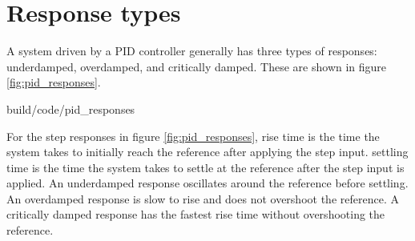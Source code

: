 \section{Response types}

A \gls{system} driven by a PID controller generally has three types of
responses: underdamped, overdamped, and critically damped. These are shown in
figure \ref{fig:pid_responses}.

\begin{svg}{build/code/pid_responses}
  \caption{PID controller response types}
  \label{fig:pid_responses}
\end{svg}

For the \glspl{step response} in figure \ref{fig:pid_responses}, \gls{rise time}
is the time the \gls{system} takes to initially reach the \gls{reference} after
applying the \gls{step input}. \Gls{settling time} is the time the \gls{system}
takes to settle at the \gls{reference} after the \gls{step input} is applied. An
underdamped response oscillates around the \gls{reference} before settling. An
overdamped response is slow to rise and does not overshoot the \gls{reference}.
A critically damped response has the fastest \gls{rise time} without
overshooting the \gls{reference}.
